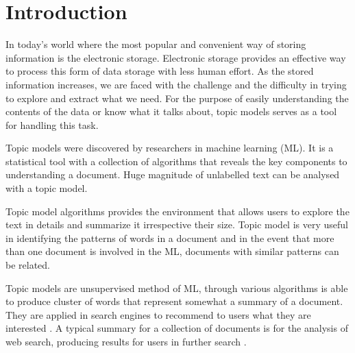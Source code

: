 \chapter{Introduction}

%
%
%

In today's world where the most popular and convenient way of storing information is the electronic storage. Electronic storage provides an effective way to process this form of data storage with less human effort. As the stored information increases, we are faced with the challenge and the difficulty in trying to explore and extract what we need. For the purpose of easily understanding the contents of the data or know what it talks about, topic models serves as a tool for handling this task.

Topic models were discovered by researchers in  machine learning (ML).  It is a statistical tool with a collection of algorithms that reveals the key components to understanding a document. Huge magnitude of unlabelled text can be analysed with a topic model.

Topic model algorithms provides the environment that allows   users to explore the text in details and summarize it irrespective their size. Topic model is very useful in identifying the patterns of words in a document and in the event that more than one document is involved in the ML, documents with similar patterns can be related. 

Topic models are unsupervised method of ML, through various algorithms is able to produce cluster of words that represent somewhat a summary of a document. They are applied in search engines to recommend to users what they are interested . A typical summary for a collection of documents is for the analysis of web search, producing results for users in further search \citep{turpin2007fast} . %

